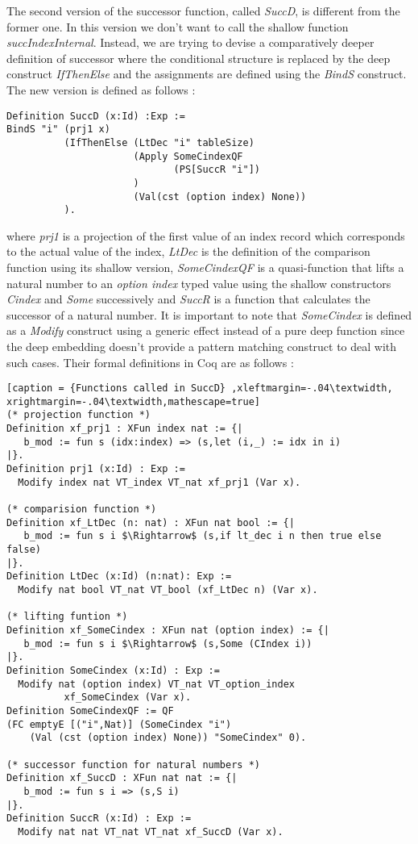 The second version of the successor function, called \textit{SuccD}, is different from the former one. In this version we don't want to call the shallow function \textit{succIndexInternal}. Instead, we are trying to devise a comparatively deeper definition of successor where the conditional structure is replaced by the deep construct \textit{IfThenElse} and the assignments are defined using the \textit{BindS} construct. The new version is defined as follows : 
\begin{lstlisting}[caption = {Definition of SuccD},label={SuccD}]
Definition SuccD (x:Id) :Exp :=
BindS "i" (prj1 x) 
          (IfThenElse (LtDec "i" tableSize) 
                      (Apply SomeCindexQF
                             (PS[SuccR "i"])
                      ) 
                      (Val(cst (option index) None))
          ).
\end{lstlisting} \vspace{4pt}
where \textit{prj1} is a projection of the first value of an index record which corresponds to the actual value of the index, \textit{LtDec} is the definition of the comparison function using its shallow version, \textit{SomeCindexQF} is a quasi-function that lifts a natural number to an \textit{option index} typed value using the shallow constructors \textit{Cindex} and \textit{Some} successively and \textit{SuccR} is a function that calculates the successor of a natural number. It is important to note that \textit{SomeCindex} is defined as a \textit{Modify} construct using a generic effect instead of a pure deep function since the deep embedding doesn’t provide a pattern matching construct to deal with such cases. Their formal definitions in Coq are as follows :   
\begin{lstlisting}[caption = {Functions called in SuccD} ,xleftmargin=-.04\textwidth,
xrightmargin=-.04\textwidth,mathescape=true]
(* projection function *)
Definition xf_prj1 : XFun index nat := {|
   b_mod := fun s (idx:index) => (s,let (i,_) := idx in i)
|}.
Definition prj1 (x:Id) : Exp :=
  Modify index nat VT_index VT_nat xf_prj1 (Var x). 
  
(* comparision function *)
Definition xf_LtDec (n: nat) : XFun nat bool := {|
   b_mod := fun s i $\Rightarrow$ (s,if lt_dec i n then true else false)
|}.
Definition LtDec (x:Id) (n:nat): Exp :=
  Modify nat bool VT_nat VT_bool (xf_LtDec n) (Var x). 

(* lifting funtion *)
Definition xf_SomeCindex : XFun nat (option index) := {|
   b_mod := fun s i $\Rightarrow$ (s,Some (CIndex i))
|}.
Definition SomeCindex (x:Id) : Exp :=
  Modify nat (option index) VT_nat VT_option_index  
  	      xf_SomeCindex (Var x).
Definition SomeCindexQF := QF 
(FC emptyE [("i",Nat)] (SomeCindex "i") 
    (Val (cst (option index) None)) "SomeCindex" 0).

(* successor function for natural numbers *)
Definition xf_SuccD : XFun nat nat := {|
   b_mod := fun s i => (s,S i)
|}.
Definition SuccR (x:Id) : Exp :=
  Modify nat nat VT_nat VT_nat xf_SuccD (Var x).
\end{lstlisting} \vspace{4pt} 

